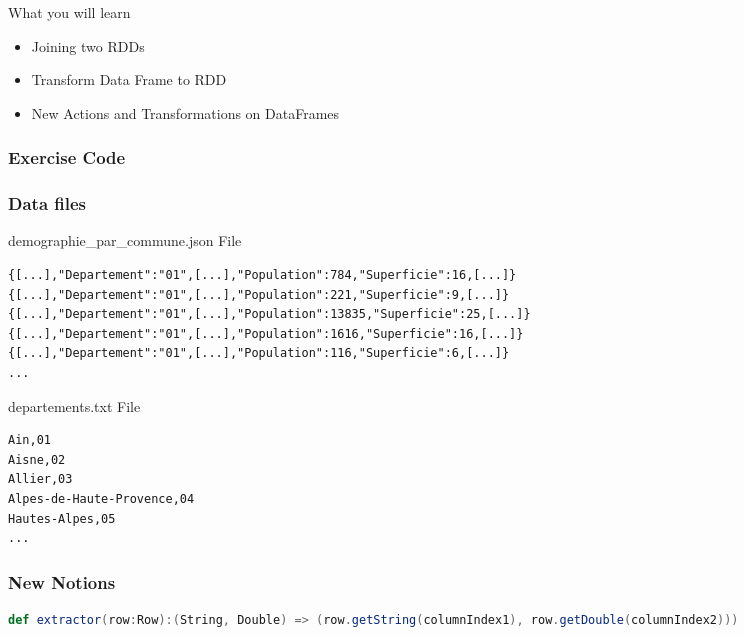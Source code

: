 \documentclass[slidetop,9pt,utf8]{beamer}
\begin{document}
\begin{CJK}{UTF8}{gbsn}
\begin{frame}
  \begin{block}{What you will learn}
    \begin{itemize}
      \item Joining two RDDs
      \item Transform Data Frame to RDD
      \item New Actions and Transformations on DataFrames
    \end{itemize}
  \end{block}

\end{frame}

\begin{frame}
  \frametitle{Exercise Code}

  

\end{frame}

\begin{frame}[fragile]
  \frametitle{Data files}

  \begin{block}{demographie\_par\_commune.json File}
    \begin{verbatim}
{[...],"Departement":"01",[...],"Population":784,"Superficie":16,[...]}
{[...],"Departement":"01",[...],"Population":221,"Superficie":9,[...]}
{[...],"Departement":"01",[...],"Population":13835,"Superficie":25,[...]}
{[...],"Departement":"01",[...],"Population":1616,"Superficie":16,[...]}
{[...],"Departement":"01",[...],"Population":116,"Superficie":6,[...]}
...
    \end{verbatim}
  \end{block}

  \begin{block}{departements.txt File}
    \begin{verbatim}
Ain,01
Aisne,02
Allier,03
Alpes-de-Haute-Provence,04
Hautes-Alpes,05
...
    \end{verbatim}
  \end{block}

\end{frame}

\begin{frame}[fragile]
  \frametitle{New Notions}

  \begin{lstlisting}[label=ExtractValueFromARow, caption=Extract value from a Row, language=scala, style=code]
def extractor(row:Row):(String, Double) => (row.getString(columnIndex1), row.getDouble(columnIndex2)))
  \end{lstlisting}


\end{frame}
\end{CJK}
\end{document}
